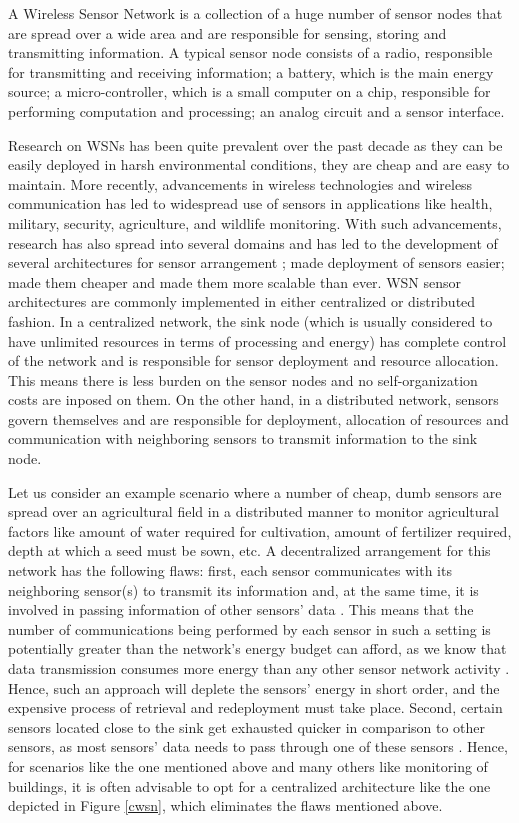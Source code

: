A Wireless Sensor Network is a collection of a huge number of sensor
nodes that are spread over a wide area and are responsible for
sensing, storing and transmitting information. A typical sensor node
consists of a radio, responsible for transmitting and receiving
information; a battery, which is the main energy source; a
micro-controller, which is a small computer on a chip, responsible for
performing computation and processing; an analog circuit and a sensor
interface.

Research on WSNs has been quite prevalent over the past decade as they
can be easily deployed in harsh environmental conditions, they are
cheap and are easy to maintain. More recently, advancements in
wireless technologies and wireless communication has led to widespread
use of sensors in applications like health, military, security,
agriculture, and wildlife monitoring. With such advancements, research
has also spread into several domains and has led to the development of
several architectures for sensor arrangement
\cite{akyildiz2002wireless}; made deployment of sensors easier; made
them cheaper and made them more scalable than ever. WSN sensor
architectures are commonly implemented in either centralized or
distributed fashion.  In a centralized network, the sink node (which
is usually considered to have unlimited resources in terms of
processing and energy) has complete control of the network and is
responsible for sensor deployment and resource allocation. This means
there is less burden on the sensor nodes and no self-organization
costs are inposed on them. On the other hand, in a distributed
network, sensors govern themselves and are responsible for deployment,
allocation of resources and communication with neighboring sensors to
transmit information to the sink node.

Let us consider an example scenario where a number of cheap, dumb
sensors are spread over an agricultural field in a distributed manner
to monitor agricultural factors like amount of water required for
cultivation, amount of fertilizer required, depth at which a seed must
be sown, etc. A decentralized arrangement for this network has the
following flaws: first, each sensor communicates with its neighboring
sensor(s) to transmit its information and, at the same time, it is
involved in passing information of other sensors' data
\cite{akyildiz2002wireless}. This means that the number of
communications being performed by each sensor in such a setting is
potentially greater than the network's energy budget can afford, as we
know that data transmission consumes more energy than any other sensor
network activity \cite{torres2006energy}. Hence, such an approach will
deplete the sensors' energy in short order, and the expensive process
of retrieval and redeployment must take place. Second, certain sensors
located close to the sink get exhausted quicker in comparison to other
sensors, as most sensors' data needs to pass through one of these
sensors \cite{heinzelman2002application}. Hence, for scenarios like
the one mentioned above and many others like monitoring of buildings,
it is often advisable to opt for a centralized architecture like the
one depicted in Figure \ref{cwsn}, which eliminates the flaws
mentioned above.

